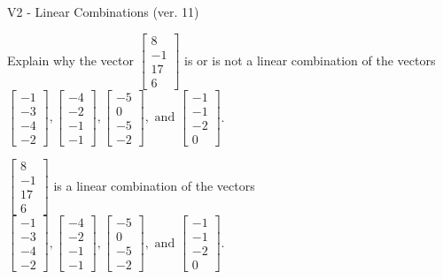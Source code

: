 \begin{exercise}
  \begin{exerciseTitle}V2 - Linear Combinations (ver. 11)\end{exerciseTitle}
  \begin{exerciseStatement}
    Explain why the vector \(\left[\begin{array}{c}
8 \\
-1 \\
17 \\
6
\end{array}\right]\)  is or is not a linear 
	combination of the vectors \(\left[\begin{array}{c}
-1 \\
-3 \\
-4 \\
-2
\end{array}\right] , \left[\begin{array}{c}
-4 \\
-2 \\
-1 \\
-1
\end{array}\right] , \left[\begin{array}{c}
-5 \\
0 \\
-5 \\
-2
\end{array}\right] , \text{ and } \left[\begin{array}{c}
-1 \\
-1 \\
-2 \\
0
\end{array}\right]\).
	


  \end{exerciseStatement}
  \begin{exerciseAnswer}
   \(\left[\begin{array}{c}
8 \\
-1 \\
17 \\
6
\end{array}\right]\) 
  	 is  
	a linear combination of the vectors \(\left[\begin{array}{c}
-1 \\
-3 \\
-4 \\
-2
\end{array}\right] , \left[\begin{array}{c}
-4 \\
-2 \\
-1 \\
-1
\end{array}\right] , \left[\begin{array}{c}
-5 \\
0 \\
-5 \\
-2
\end{array}\right] , \text{ and } \left[\begin{array}{c}
-1 \\
-1 \\
-2 \\
0
\end{array}\right]\).


\end{exerciseAnswer}
\end{exercise}
